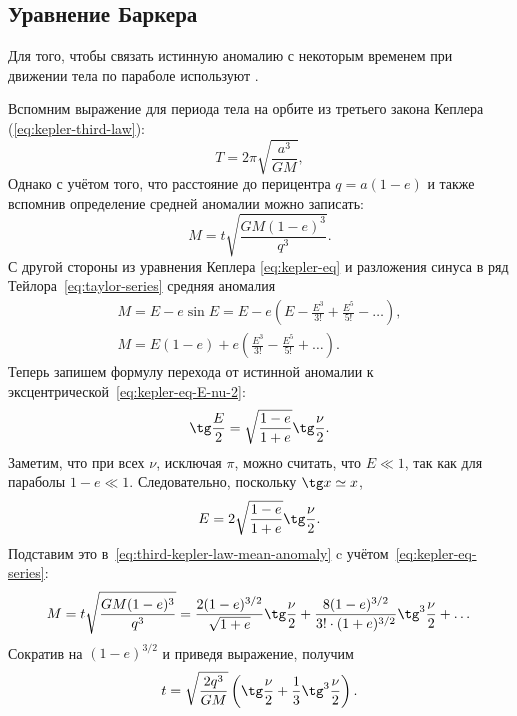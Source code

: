 \subsection{Уравнение Баркера}
Для того, чтобы связать истинную аномалию с некоторым временем при движении тела по параболе используют .

Вспомним выражение для периода тела на орбите из третьего закона Кеплера (\ref{eq:kepler-third-law}):
\begin{equation*}
    T = 2\pi \sqrt{\frac{a^3}{GM}},
\end{equation*}
Однако с учётом того, что расстояние до перицентра  $q = a(1-e)$ и также вспомнив определение средней аномалии можно записать:
\begin{equation}
    M = t \sqrt{\frac{GM(1 - e)^3}{q^3}}.
    \label{eq:third-kepler-law-mean-anomaly}
\end{equation}
С другой стороны из уравнения Кеплера \eqref{eq:kepler-eq} и разложения синуса в ряд Тейлора~\eqref{eq:taylor-series} средняя аномалия
\begin{gather}
    M = E - e \sin E = E - e \left(E - \frac{E^3}{3!} + \frac{E^5}{5!} - \dots\right),\nonumber\\
    M = E(1-e) + e\left(\frac{E^3}{3!} - \frac{E^5}{5!} + \dots \right).
    \label{eq:kepler-eq-series}
\end{gather}
Теперь запишем формулу перехода от истинной аномалии к эксцентрической~\eqref{eq:kepler-eq-E-nu-2}:
\begin{equation*}
    \tg \frac{E}{2} = \sqrt{\frac{1-e}{1+e}} \tg \frac{\nu}{2}.
\end{equation*}
Заметим, что при всех $\nu$, исключая $\pi$, можно считать, что $E \ll 1$, так как для параболы $1-e \ll 1$. Следовательно, поскольку $\tg x \simeq x$,
\begin{equation*}
    E = 2 \sqrt{\frac{1-e}{1+e}} \tg \frac{\nu}{2}.
\end{equation*}
Подставим это в~\eqref{eq:third-kepler-law-mean-anomaly} c учётом~\eqref{eq:kepler-eq-series}:
\begin{equation*}
    M = t \sqrt{\frac{GM(1-e)^3}{q^3}} = \frac{2(1-e)^{3/2}}{\sqrt{1+e}}\tg\frac{\nu}{2} + \frac{8(1-e)^{3/2}}{3! \cdot (1+e)^{3/2}}\tg^3 \frac{\nu}{2} + \dots
\end{equation*}
Сократив на $(1-e)^{3/2}$ и приведя выражение, получим 
\begin{equation}
    t = \sqrt{\frac{2q^3}{GM}}\left(\tg \frac{\nu}{2 } + \frac{1}{3}\tg^3 \frac{\nu}{2}\right).
\end{equation}
